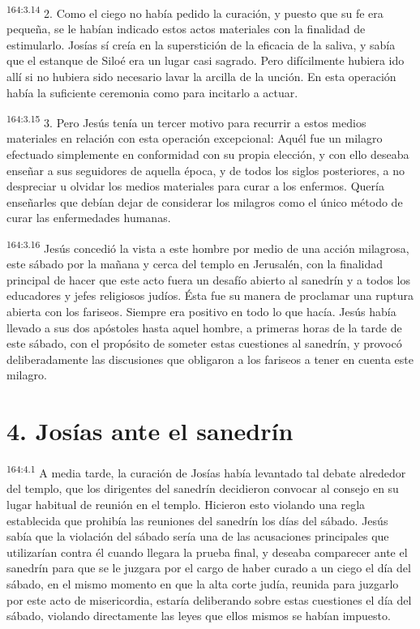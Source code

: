 \par 
\textsuperscript{164:3.14} 2. Como el ciego no había pedido la curación, y puesto que su fe era pequeña, se le habían indicado estos actos materiales con la finalidad de estimularlo. Josías sí creía en la superstición de la eficacia de la saliva, y sabía que el estanque de Siloé era un lugar casi sagrado. Pero difícilmente hubiera ido allí si no hubiera sido necesario lavar la arcilla de la unción. En esta operación había la suficiente ceremonia como para incitarlo a actuar.

\par 
\textsuperscript{164:3.15} 3. Pero Jesús tenía un tercer motivo para recurrir a estos medios materiales en relación con esta operación excepcional: Aquél fue un milagro efectuado simplemente en conformidad con su propia elección, y con ello deseaba enseñar a sus seguidores de aquella época, y de todos los siglos posteriores, a no despreciar u olvidar los medios materiales para curar a los enfermos. Quería enseñarles que debían dejar de considerar los milagros como el único método de curar las enfermedades humanas.

\par 
\textsuperscript{164:3.16} Jesús concedió la vista a este hombre por medio de una acción milagrosa, este sábado por la mañana y cerca del templo en Jerusalén, con la finalidad principal de hacer que este acto fuera un desafío abierto al sanedrín y a todos los educadores y jefes religiosos judíos.
Ésta fue su manera de proclamar una ruptura abierta con los fariseos. Siempre era positivo en todo lo que hacía. Jesús había llevado a sus dos apóstoles hasta aquel hombre, a primeras horas de la tarde de este sábado, con el propósito de someter estas cuestiones al sanedrín, y provocó deliberadamente las discusiones que obligaron a los fariseos a tener en cuenta este milagro.

\section*{4. Josías ante el sanedrín}
\par 
\textsuperscript{164:4.1} A media tarde, la curación de Josías había levantado tal debate alrededor del templo, que los dirigentes del sanedrín decidieron convocar al consejo en su lugar habitual de reunión en el templo. Hicieron esto violando una regla establecida que prohibía las reuniones del sanedrín los días del sábado. Jesús sabía que la violación del sábado sería una de las acusaciones principales que utilizarían contra él cuando llegara la prueba final, y deseaba comparecer ante el sanedrín para que se le juzgara por el cargo de haber curado a un ciego el día del sábado, en el mismo momento en que la alta corte judía, reunida para juzgarlo por este acto de misericordia, estaría deliberando sobre estas cuestiones el día del sábado, violando directamente las leyes que ellos mismos se habían impuesto.

